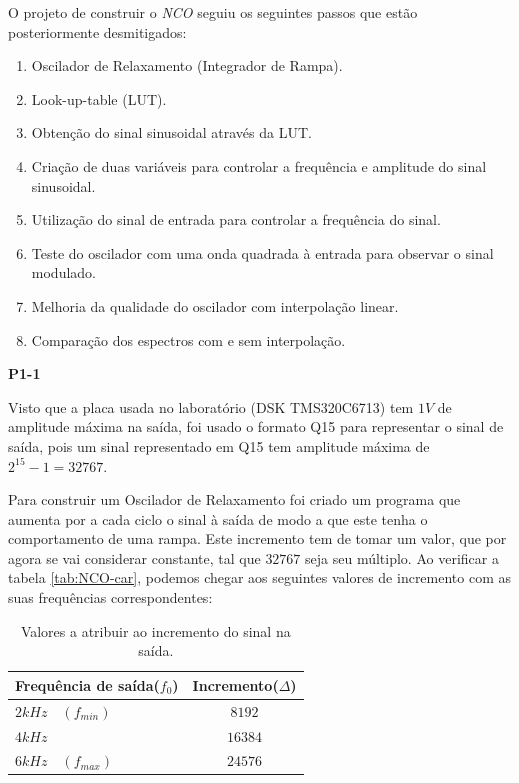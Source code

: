 \documentclass[11pt]{article}
\begin{document}
O projeto de construir o \textit{NCO} seguiu os seguintes passos que estão posteriormente desmitigados:

\begin{enumerate}
	\item Oscilador de Relaxamento (Integrador de Rampa). %
	\item Look-up-table (LUT). %
	\item Obtenção do sinal sinusoidal através da LUT.%
	\item Criação de duas variáveis para controlar a frequência e amplitude do sinal sinusoidal. %
	\item Utilização do sinal de entrada para controlar a frequência do sinal. %
	\item Teste do oscilador com uma onda quadrada à entrada para observar o sinal modulado.  %
	\item Melhoria da qualidade do oscilador com interpolação linear. %
	\item Comparação dos espectros com e sem interpolação.%
\end{enumerate}
\pagebreak

\textbf{P1-1}
\label{para:P1-1}

 Visto que a placa usada no laboratório (DSK TMS320C6713) tem $1 V$ de amplitude máxima na saída, foi usado o formato Q15 para representar o sinal de saída, pois um sinal representado em Q15 tem amplitude máxima de $2^{15}-1 = 32767 $.

Para construir um Oscilador de Relaxamento foi criado um programa que aumenta por a cada ciclo o sinal à saída de modo a que este tenha o comportamento de uma rampa. Este incremento tem de tomar um valor, que por agora se vai considerar constante, tal que $32767$ seja seu múltiplo. Ao verificar a tabela \ref{tab:NCO-car}, podemos chegar aos seguintes valores de incremento com as suas frequências correspondentes:


\begin{table}[H]
	\centering
	\caption{Valores a atribuir ao incremento do sinal na saída.}
	\label{tab:incrementos}
	\begin{tabular}[c]{|l||c|}
		\hline \textbf{Frequência de saída($f_0$)} & \textbf{Incremento($\Delta$)}\\ 
		\hline $ 2 kHz \quad (f_{min}) $ & $ 8192 $\\ 
		\hline $ 4 kHz $ & $ 16384 $  \\ 
		\hline $ 6 kHz \quad (f_{max}) $ & $ 24576 $ \\ 
		\hline
	\end{tabular}
\end{table}
\end{document}
